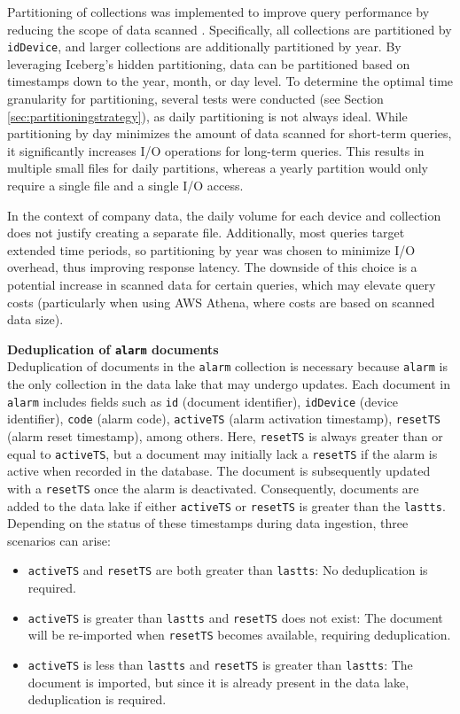 Partitioning of collections was implemented to improve query performance by reducing the scope of data scanned \cite{ponnusamy2024scalable}. Specifically, all collections are partitioned by \texttt{idDevice}, and larger collections are additionally partitioned by year. By leveraging Iceberg's hidden partitioning, data can be partitioned based on timestamps down to the year, month, or day level. To determine the optimal time granularity for partitioning, several tests were conducted (see Section \ref{sec:partitioningstrategy}), as daily partitioning is not always ideal. While partitioning by day minimizes the amount of data scanned for short-term queries, it significantly increases \ac{I/O} operations for long-term queries. This results in multiple small files for daily partitions, whereas a yearly partition would only require a single file and a single \ac{I/O} access. 

In the context of company data, the daily volume for each device and collection does not justify creating a separate file. Additionally, most queries target extended time periods, so partitioning by year was chosen to minimize \ac{I/O} overhead, thus improving response latency. The downside of this choice is a potential increase in scanned data for certain queries, which may elevate query costs (particularly when using \ac{AWS} Athena, where costs are based on scanned data size).

\textbf{Deduplication of \texttt{alarm} documents} \\
Deduplication of documents in the \texttt{alarm} collection is necessary because \texttt{alarm} is the only collection in the data lake that may undergo updates. Each document in \texttt{alarm} includes fields such as \texttt{id} (document identifier), \texttt{idDevice} (device identifier), \texttt{code} (alarm code), \texttt{activeTS} (alarm activation timestamp), \texttt{resetTS} (alarm reset timestamp), among others. Here, \texttt{resetTS} is always greater than or equal to \texttt{activeTS}, but a document may initially lack a \texttt{resetTS} if the alarm is active when recorded in the database. The document is subsequently updated with a \texttt{resetTS} once the alarm is deactivated. Consequently, documents are added to the data lake if either \texttt{activeTS} or \texttt{resetTS} is greater than the \texttt{lastts}. Depending on the status of these timestamps during data ingestion, three scenarios can arise:

\begin{itemize}
    \item \texttt{activeTS} and \texttt{resetTS} are both greater than \texttt{lastts}: No deduplication is required.
    \item \texttt{activeTS} is greater than \texttt{lastts} and \texttt{resetTS} does not exist: The document will be re-imported when \texttt{resetTS} becomes available, requiring deduplication.
    \item \texttt{activeTS} is less than \texttt{lastts} and \texttt{resetTS} is greater than \texttt{lastts}: The document is imported, but since it is already present in the data lake, deduplication is required.
\end{itemize}

